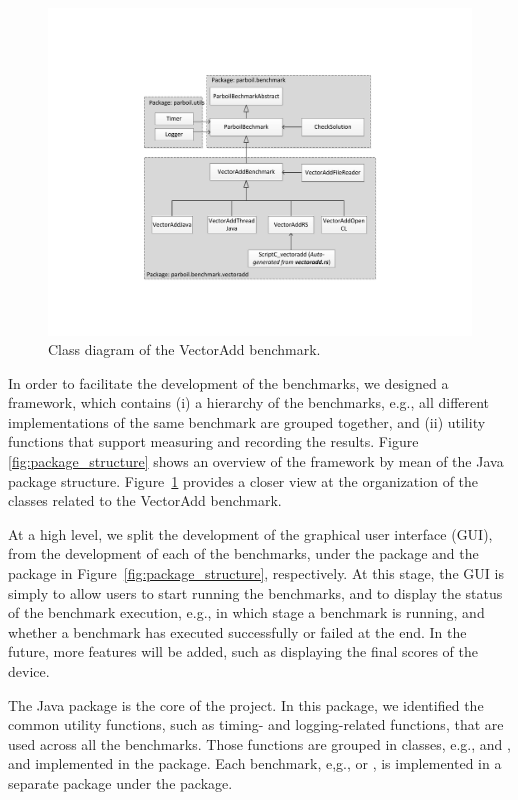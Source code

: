 \begin{figure}
\centering
\includegraphics[scale=0.5]{figs/vectoradd_class_diagram.pdf}
\caption{Class diagram of the VectorAdd benchmark.}
\label{fig:class_diagram}
\centering
\end{figure}

In order to facilitate the development of the benchmarks, we designed a
framework,  which contains (i) a hierarchy of the benchmarks, e.g.,
all different implementations of the same benchmark are grouped together, and
(ii) utility functions that support measuring and recording the results.
Figure \ref{fig:package_structure} shows an overview of the framework by mean
of the Java package structure. Figure~\ref{fig:class_diagram} provides a closer
view at the organization of the classes related to the VectorAdd benchmark.

At a high level, we split the development of the graphical user interface (GUI),
from the development of each of the benchmarks, under the  package and
the  package in Figure~\ref{fig:package_structure}, respectively.
At this stage, the GUI is simply to allow users to start running the benchmarks,
and to display the status of the benchmark execution, e.g., in which stage a
benchmark is running, and whether a benchmark has executed successfully or
failed at the end. In the future, more features will be added, such as
displaying the final scores of the device.

The  Java package is the core of the project. In this package, we
identified the common utility functions, such as timing- and logging-related
functions, that are used across all the benchmarks. Those functions are grouped
in classes, e.g.,  and , and implemented in the
 package. Each benchmark, e,g.,  or , is
implemented in a separate package under the  package. 

